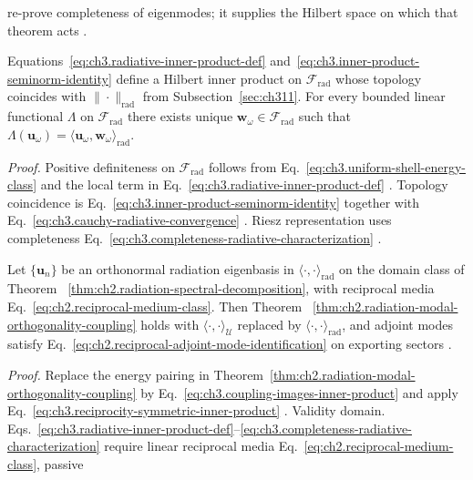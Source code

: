 re-prove completeness of eigenmodes; it supplies the Hilbert space on which that theorem acts
\cite{harrington2001}.
\begin{proposition}
\label{prop:ch3.inner-product-hilbert-topology}
Equations~\eqref{eq:ch3.radiative-inner-product-def} and~\eqref{eq:ch3.inner-product-seminorm-identity}
define a Hilbert inner product on \(\mathcal{F}_{\mathrm{rad}}\) whose topology coincides with
\(\|\cdot\|_{\mathrm{rad}}\) from Subsection~\ref{sec:ch311}. For every bounded linear functional
\(\Lambda\) on \(\mathcal{F}_{\mathrm{rad}}\) there exists unique \(\mathbf{w}_\omega\in\mathcal{F}_{\mathrm{rad}}\)
such that \(\Lambda(\mathbf{u}_\omega)=\langle\mathbf{u}_\omega,\mathbf{w}_\omega\rangle_{\mathrm{rad}}\).
\end{proposition}
\noindent\textit{Proof.}
Positive definiteness on \(\mathcal{F}_{\mathrm{rad}}\) follows from
Eq.~\eqref{eq:ch3.uniform-shell-energy-class} and the local term in
Eq.~\eqref{eq:ch3.radiative-inner-product-def} \cite{stratton1941}. Topology coincidence is
Eq.~\eqref{eq:ch3.inner-product-seminorm-identity} together with
Eq.~\eqref{eq:ch3.cauchy-radiative-convergence} \cite{harrington2001}. Riesz representation uses
completeness Eq.~\eqref{eq:ch3.completeness-radiative-characterization} \cite{stratton1941}.
\begin{proposition}
\label{prop:ch3.reciprocity-orthonormal-frame}
Let \(\{\mathbf{u}_n\}\) be an orthonormal radiation eigenbasis in
\(\langle\cdot,\cdot\rangle_{\mathrm{rad}}\) on the domain class of Theorem
~\ref{thm:ch2.radiation-spectral-decomposition}, with reciprocal media
Eq.~\eqref{eq:ch2.reciprocal-medium-class}. Then Theorem
~\ref{thm:ch2.radiation-modal-orthogonality-coupling} holds with
\(\langle\cdot,\cdot\rangle_{\mathcal{U}}\) replaced by
\(\langle\cdot,\cdot\rangle_{\mathrm{rad}}\), and adjoint modes satisfy
Eq.~\eqref{eq:ch2.reciprocal-adjoint-mode-identification} on exporting sectors
\cite{stratton1941}.
\end{proposition}
\noindent\textit{Proof.}
Replace the energy pairing in Theorem~\ref{thm:ch2.radiation-modal-orthogonality-coupling} by
Eq.~\eqref{eq:ch3.coupling-images-inner-product} and apply
Eq.~\eqref{eq:ch3.reciprocity-symmetric-inner-product} \cite{stratton1941}.
Validity domain. Eqs.~\eqref{eq:ch3.radiative-inner-product-def}--\eqref{eq:ch3.completeness-radiative-characterization}
require linear reciprocal media Eq.~\eqref{eq:ch2.reciprocal-medium-class}, passive
